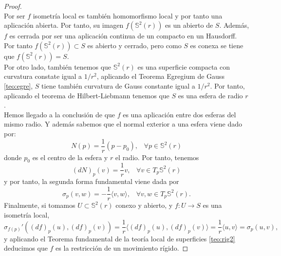 \begin{proof}
	${ }$\\
	
	Por ser $f$ isometría local es también homomorfismo local y por tanto una aplicación abierta. Por tanto, su imagen $f(\mathbb{S}^2(r))$ es un abierto de $S$. Además, $f$ es cerrada por ser una aplicación continua de un compacto en un Hausdorff. Por tanto $f(\mathbb{S}^2(r)) \subset S$ es abierto y cerrado, pero como $S$ es conexa se tiene que $f(\mathbb{S}^2(r)) = S$.
		${ }$\\
		
	Por otro lado, también tenemos que $\mathbb{S}^2(r)$ es una superficie compacta con curvatura constate igual a $1 / r^2$, aplicando el Teorema Egregium de Gauss \ref{teo:egre}, $S$ tiene también curvatura de Gauss constante igual a $1 / r^2$. Por tanto, aplicando el teorema de Hilbert-Liebmann tenemos que $S$ es una esfera de radio $r$.
		${ }$\\
		
	Hemos llegado a la conclusión de que $f$ es una aplicación entre dos esferas del mismo radio. Y además sabemos que el normal exterior a una esfera viene dado por:
	${ }$\\
	\[
		N(p) = \frac{1}{r} (p - p_0),  \;\;\;  \forall p \in \mathbb{S}^2(r)
	\]
	${ }$\\
	donde $p_0$ es el centro de la esfera y $r$ el radio. Por tanto, tenemos
	${ }$\\
	\[
		(dN)_p (v) = \frac{1}{r} v,  \;\;\;  \forall v \in T_p \mathbb{S}^2(r)
	\]
	${ }$\\
	y por tanto, la segunda forma fundamental viene dada por
	${ }$\\
	\[
		\sigma_p (v, w) = - \frac{1}{r} \langle v, w \rangle,  \;\;\;  \forall v, w \in T_p \mathbb{S}^2(r).
	\]
	${ }$\\
	
	Finalmente, si tomamos $U \subset \mathbb{S}^2(r)$ conexo y abierto, y $f: U \to  S$ es una isometría local,
	${ }$\\
	\[
		\sigma_{f(p)}'((df)_p(u), (df)_p(v)) = \frac{1}{r} \langle (df)_p(u), (df)_p(v) \rangle = \frac{1}{r} \langle u, v \rangle = \sigma_p (u,v),
	\]
	${ }$\\
	y aplicando el Teorema fundamental de la teoría local de superficies \ref{teo:rig2} deducimos que $f$ es la restricción de un movimiento rígido.
	
	
	
	
\end{proof}
	${ }$\\







